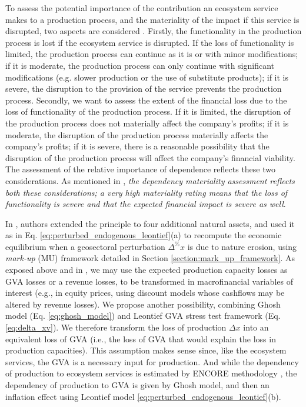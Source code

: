\documentclass{article}
\begin{document}
To assess the potential importance of the contribution an ecosystem service makes to a production process, and the materiality of the impact if this service is disrupted, two aspects are considered \cite{mcconnell2005valuing}. Firstly, the functionality in the production process is lost if the ecosystem service is disrupted. If the loss of functionality is limited, the production process can continue as it is or with minor modifications; if it is moderate, the production process can only continue with significant modifications (e.g. slower production or the use of substitute products); if it is severe, the disruption to the provision of the service prevents the production process. Secondly, we want to assess the extent of the financial loss due to the loss of functionality of the production process. If it is limited, the disruption of the production process does not materially affect the company's profits; if it is moderate, the disruption of the production process materially affects the company's profits; if it is severe, there is a reasonable possibility that the disruption of the production process will affect the company's financial viability. The assessment of the relative importance of dependence reflects these two considerations. As mentioned in \cite{ENCORE}, \textit{the dependency materiality assessment reflects both these considerations; a very high materiality rating means that the loss of functionality is severe and that the expected financial impact is severe as well}.

\vspace{0.1cm}

In \cite{pineau2024nature}, authors extended the principle to four additional natural assets, and used it as in Eq. \eqref{eq:perturbed_endogenous_leontief}(a) to recompute the economic equilibrium when a geosectoral perturbation $\Delta^\% x$ is due to nature erosion, using \textit{mark-up} (MU) framework detailed in Section \ref{section:mark_up_framework}. As exposed above and in \cite{pineau2024nature}, we may use the expected production capacity losses as GVA losses or a revenue losses, to be transformed in macrofinancial variables of interest (e.g., in equity prices, using discount models whose cashflows may be altered by revenue losses). We propose another possibility, combining Ghosh model (Eq. \eqref{eq:ghosh_model}) and Leontief GVA stress test framework (Eq. \eqref{eq:delta_xv}). We therefore transform the loss of production $\Delta x$ into an equivalent loss of GVA (i.e., the loss of GVA that would explain the loss in production capacities). This assumption makes sense since, like the ecosystem services, the GVA is a necessary input for production. And while the dependency of production to ecosystem services is estimated by ENCORE methodology \cite{ENCORE}, the dependency of production to GVA is given by Ghosh model, and then an inflation effect using Leontief model \eqref{eq:perturbed_endogenous_leontief}(b). 
\end{document}
